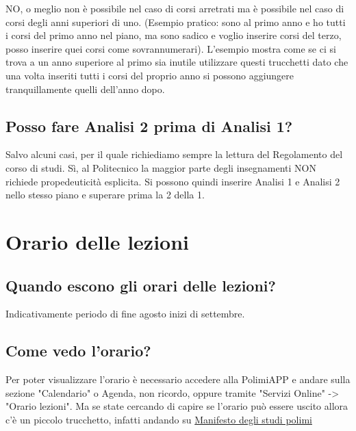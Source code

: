 \documentclass[legal]{polinetwork}
\begin{document}
NO, o meglio non è possibile nel caso di corsi arretrati ma è possibile nel caso di corsi degli anni superiori di uno. (Esempio pratico: sono al primo anno e ho tutti i corsi del primo anno nel piano, ma sono sadico e voglio inserire corsi del terzo, posso inserire quei corsi come sovrannumerari). L'esempio mostra come se ci si trova a un anno superiore al primo sia inutile utilizzare questi trucchetti dato che una volta inseriti tutti i corsi del proprio anno si possono aggiungere tranquillamente quelli dell'anno dopo.

\subsection{Posso fare Analisi 2 prima di Analisi 1?}


Salvo alcuni casi, per il quale richiediamo sempre la lettura del Regolamento del corso di studi. Sì, al Politecnico la maggior parte degli insegnamenti NON richiede propedeuticità esplicita. Si possono quindi inserire Analisi 1 e Analisi 2 nello stesso piano e superare prima la 2 della 1.


\section{Orario delle lezioni}


\subsection{Quando escono gli orari delle lezioni?}


Indicativamente periodo di fine agosto inizi di settembre.

\subsection{Come vedo l'orario?}


Per poter visualizzare l'orario è necessario accedere alla PolimiAPP e andare sulla sezione "Calendario" o Agenda, non ricordo, oppure tramite "Servizi Online" -> "Orario lezioni". Ma se state cercando di capire se l'orario può essere uscito allora c'è un piccolo trucchetto, infatti andando su \href{https://onlineservices.polimi.it/manifesti/manifesti/controller/ManifestoPublic.do?evn_DEFAULT=evento\&lang=IT}{Manifesto degli studi polimi}
\end{document}
